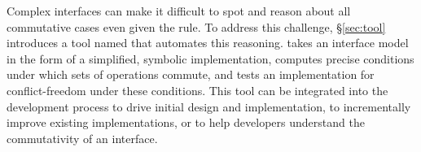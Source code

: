 \begin{comment}
Applying the rule to real-world software systems poses two challenges.
%
First, the usual definition of commutativity is limited in ways that
restricts its applicability to complex, stateful interfaces.  To
address this challenge, \S\ref{sec:rule} defines a novel form of
commutativity named \emph{\SIM\ commutativity}.
%
\SIM commutativity is \emph{state-dependent}: rather than requiring
operations to be order-invariant in all states, \SIM\ commutativity
allows developers to reason not only about specific arguments for
which operations commute, but also in which system states they
commute, exposing more opportunities to apply the rule.  The above
example from POSIX shows why this is important: creating files with
different names does \emph{not} commute if the names are symlinks to
the same name, but this one case does not limit the rule's
applicability to other file system states.
%
\SIM\ commutativity is \emph{region-oriented}: rather than applying to just
two operations, \SIM\ commutativity applies to a region of an execution
trace, which may contain several operations, again exposing more
opportunities to apply the rule.
%
Finally, it is \emph{interface-based}: rather than requiring all
operation orders to produce identical internal states, it requires the
resulting states to be indistinguishable via the interface, allowing
developers to reason about commutativity independent of any specific
implementation.

\XXX[AC][Spread the above new terminology to the rest of the paper.]
\end{comment}

Complex interfaces can make it difficult to spot and reason about all
commutative cases even given the rule.  To address this challenge,
\S\ref{sec:tool} introduces a tool named \tool that automates this
reasoning.  \tool takes an interface model
in the form of a simplified, symbolic implementation, computes precise
conditions under which sets of operations commute, and tests an
implementation for conflict-freedom under these conditions.  This tool can be
integrated into the development process to drive initial design and
implementation, to incrementally improve existing implementations, or to
help developers understand the commutativity of an interface.
%


